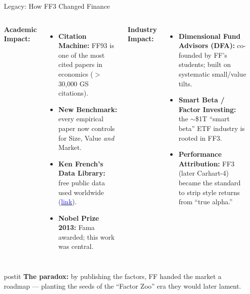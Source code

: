 \documentclass{beamer}
\begin{document}
\begin{frame}{Legacy: How FF3 Changed Finance}
	\small
	\begin{columns}
		\textbf{Academic Impact:}
		\begin{itemize}\setlength\itemsep{1pt}
			\item \textbf{Citation Machine:} FF93 is one of the most cited papers in economics ($>$30{,}000 GS citations).
			\item \textbf{New Benchmark:} every empirical paper now controls for Size, Value \textit{and} Market.
			\item \textbf{Ken French's Data Library:} free public data used worldwide (\href{https://mba.tuck.dartmouth.edu/pages/faculty/ken.french/data_library.html}{\textcolor{blue}{link}}).
			\item \textbf{Nobel Prize 2013:} Fama awarded; this work was central.
		\end{itemize}
		\textbf{Industry Impact:}
		\begin{itemize}\setlength\itemsep{1pt}
			\item \textbf{Dimensional Fund Advisors (DFA):} co-founded by FF's students; built on systematic small/value tilts.
			\item \textbf{Smart Beta / Factor Investing:} the $\sim$\$1T ``smart beta'' ETF industry is rooted in FF3.
			\item \textbf{Performance Attribution:} FF3 (later Carhart-4) became the standard to strip style returns from ``true alpha.''
		\end{itemize}
	\end{columns}
	\vspace{2pt}
	\begin{beamercolorbox}[sep=0.3em,wd=\linewidth,rounded=true,shadow=true]{postit}
		\footnotesize \textbf{The paradox:} by publishing the factors, FF handed the market a roadmap --- planting the seeds of the ``Factor Zoo'' era they would later lament.
	\end{beamercolorbox}
\end{frame}
\end{document}
